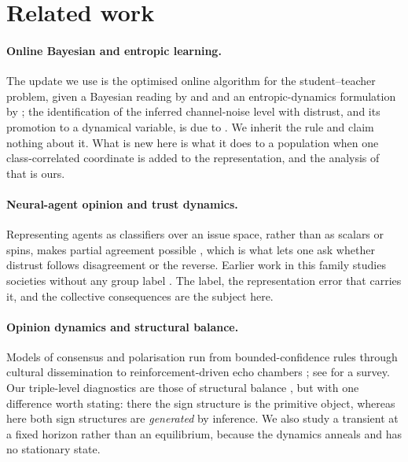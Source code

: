 \section{Related work}
\label{sec:related}

\paragraph{Online Bayesian and entropic learning.} The update we use is the
optimised online algorithm for the student--teacher problem, given a Bayesian
reading by \citet{opper1996online,opper1998bayesian} and \citet{solla1999optimal}
and an entropic-dynamics formulation by \citet{caticha2020entropic}; the
identification of the inferred channel-noise level with distrust, and its
promotion to a dynamical variable, is due to \citet{alves2016distrust}. We
inherit the rule and claim nothing about it. What is new here is what it does to
a population when one class-correlated coordinate is added to the
representation, and the analysis of that is ours.

\paragraph{Neural-agent opinion and trust dynamics.} Representing agents as
classifiers over an issue space, rather than as scalars or spins, makes partial
agreement possible \citep{caticha2011agent,caticha2015whom}, which is what lets
one ask whether distrust follows disagreement or the reverse. Earlier work in
this family studies societies without any group label
\citep{simoes2018mean,caticha2019trust}. The label, the representation error that
carries it, and the collective consequences are the subject here.

\paragraph{Opinion dynamics and structural balance.} Models of consensus and
polarisation run from bounded-confidence rules
\citep{deffuant2000mixing,hegselmann2002opinion} through cultural dissemination
\citep{axelrod1997dissemination} to reinforcement-driven echo chambers
\citep{baumann2020modeling}; see \citet{castellano2009statistical} for a survey.
Our triple-level diagnostics are those of structural balance
\citep{heider1946attitudes,cartwright1956structural,antal2005dynamics,marvel2011continuous},
but with one difference worth stating: there the sign structure is the primitive
object, whereas here both sign structures are \emph{generated} by inference. We
also study a transient at a fixed horizon rather than an equilibrium, because the
dynamics anneals and has no stationary state.

